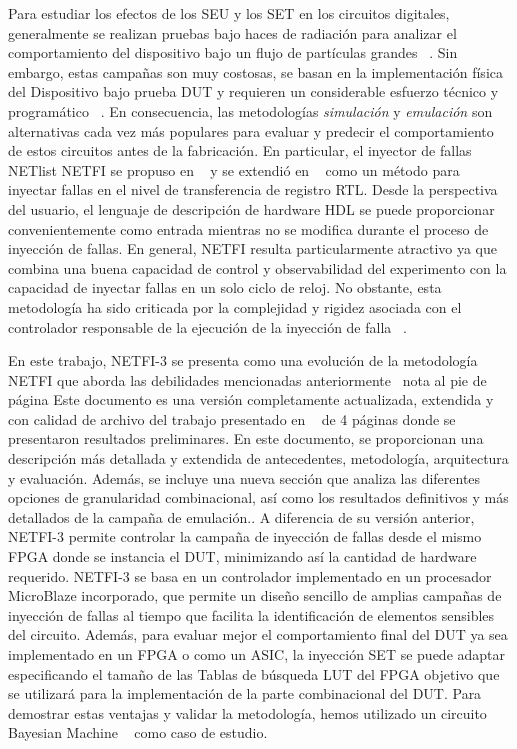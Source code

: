 Para estudiar los efectos de los SEU y los SET en los circuitos digitales, generalmente se realizan pruebas bajo haces de radiación para analizar el comportamiento del dispositivo bajo un flujo de partículas grandes ~\cite{Criswell1984}.
Sin embargo, estas campañas son muy costosas, se basan en la implementación física del Dispositivo bajo prueba DUT y requieren un considerable esfuerzo técnico y programático ~\cite{Velazco2010}.
En consecuencia, las metodologías \emph{simulación} y \emph{emulación} son alternativas cada vez más populares para evaluar y predecir el comportamiento de estos circuitos antes de la fabricación.
En particular, el inyector de fallas NETlist NETFI se propuso en ~\cite{Mansour2013-1} y se extendió en ~\cite{Mansour2013-2} como un método para inyectar fallas en el nivel de transferencia de registro RTL.
Desde la perspectiva del usuario, el lenguaje de descripción de hardware HDL se puede proporcionar convenientemente como entrada mientras no se modifica durante el proceso de inyección de fallas.
En general, NETFI resulta particularmente atractivo ya que combina una buena capacidad de control y observabilidad del experimento con la capacidad de inyectar fallas en un solo ciclo de reloj.
No obstante, esta metodología ha sido criticada por la complejidad y rigidez asociada con el controlador responsable de la ejecución de la inyección de falla ~\cite{Serrano2015}.

En este trabajo, \mbox{NETFI-3} se presenta como una evolución de la metodología NETFI que aborda las debilidades mencionadas anteriormente \ nota al pie de página {Este documento es una versión completamente actualizada, extendida y con calidad de archivo del trabajo presentado en ~\cite{ netfi2} de 4 páginas donde se presentaron resultados preliminares. En este documento, se proporcionan una descripción más detallada y extendida de antecedentes, metodología, arquitectura y evaluación. Además, se incluye una nueva sección que analiza las diferentes opciones de granularidad combinacional, así como los resultados definitivos y más detallados de la campaña de emulación.}.
A diferencia de su versión anterior, \mbox{NETFI-3} permite controlar la campaña de inyección de fallas desde el mismo FPGA donde se instancia el DUT, minimizando así la cantidad de hardware requerido.
\mbox{NETFI-3} se basa en un controlador implementado en un procesador MicroBlaze incorporado, que permite un diseño sencillo de amplias campañas de inyección de fallas al tiempo que facilita la identificación de elementos sensibles del circuito.
Además, para evaluar mejor el comportamiento final del DUT ya sea implementado en un FPGA o como un ASIC, la inyección SET se puede adaptar especificando el tamaño de las Tablas de búsqueda LUT del FPGA objetivo que se utilizará para la implementación de la parte combinacional del DUT.
Para demostrar estas ventajas y validar la metodología, hemos utilizado un circuito Bayesian Machine ~\cite{Mazer2015} como caso de estudio.
